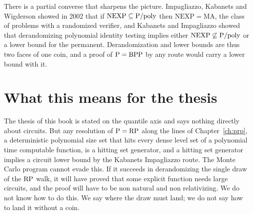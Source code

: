 There is a partial converse that sharpens the picture. Impagliazzo, Kabanets and Wigderson showed in 2002 that if $\mathrm{NEXP} \subseteq \mathrm{P}/\mathrm{poly}$ then $\mathrm{NEXP} = \mathrm{MA}$, the class of problems with a randomized verifier, and Kabanets and Impagliazzo showed that derandomizing polynomial identity testing implies either $\mathrm{NEXP} \not\subseteq \mathrm{P}/\mathrm{poly}$ or a lower bound for the permanent. Derandomization and lower bounds are thus two faces of one coin, and a proof of $\mathrm{P} = \mathrm{BPP}$ by any route would carry a lower bound with it.

\section{What this means for the thesis}

The thesis of this book is stated on the quantile axis and says nothing directly about circuits. But any resolution of $\mathrm{P} = \mathrm{RP}$ along the lines of Chapter~\ref{ch:prp}, a deterministic polynomial size set that hits every dense level set of a polynomial time computable function, is a hitting set generator, and a hitting set generator implies a circuit lower bound by the Kabanets Impagliazzo route. The Monte Carlo program cannot evade this. If it succeeds in derandomizing the single draw of the $\mathrm{RP}$ walk, it will have proved that some explicit function needs large circuits, and the proof will have to be non natural and non relativizing. We do not know how to do this. We say where the draw must land; we do not say how to land it without a coin.

